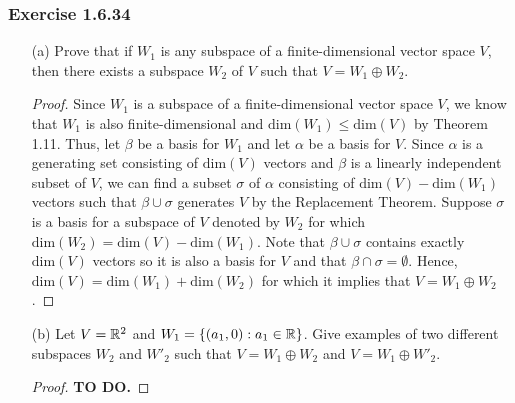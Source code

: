 \subsubsection{Exercise 1.6.34} 
\begin{enumerate}
    \item[(a)] Prove that if \( W_{1} \) is any subspace of a finite-dimensional vector space \( V  \), then there exists a subspace \( W_{2} \) of \( V  \) such that \( V = W_{1} \oplus W_{2}  \).
        \begin{proof}
        Since \( W_{1}  \) is a subspace of a finite-dimensional vector space \( V  \), we know that \( W_{1} \) is also finite-dimensional and \( \text{dim}(W_{1}) \leq \text{dim}(V) \) by Theorem 1.11. Thus, let \( \beta  \) be a basis for \( W_{1} \) and let \( \alpha  \) be a basis for \( V  \). Since \( \alpha \) is a generating set consisting of \( \text{dim}(V) \) vectors and \( \beta   \) is a linearly independent subset of \( V  \), we can find a subset \( \sigma  \) of \( \alpha  \) consisting of \( \text{dim}(V) - \text{dim}(W_{1}) \) vectors such that \( \beta \cup \sigma  \) generates \( V  \) by the Replacement Theorem. Suppose \( \sigma  \) is a basis for a subspace of \( V  \) denoted by \( W_{2} \) for which \( \text{dim}(W_{2}) = \text{dim}(V) - \text{dim}(W_{1}) \). Note that \( \beta \cup \sigma \) contains exactly \( \text{dim}(V) \) vectors so it is also a basis for \( V  \) and that \( \beta \cap \sigma = \emptyset \). Hence, \( \text{dim}(V) = \text{dim}(W_{1}) + \text{dim}(W_{2}) \) for which it implies that \( V = W_{1} \oplus W_{2} \).
        \end{proof}
    \item[(b)] Let \( V = \mathbb{R}^{2} \) and \( W_{1} = \{ (a_{1}, 0 ) : a_{1} \in \mathbb{R}  \}   \). Give examples of two different subspaces \( W_{2} \) and \( W'_{2}  \) such that \( V = W_{1} \oplus W_{2} \) and \( V = W_{1} \oplus W'_{2} \).
        \begin{proof}
        \textbf{TO DO.}
        \end{proof}
\end{enumerate}



